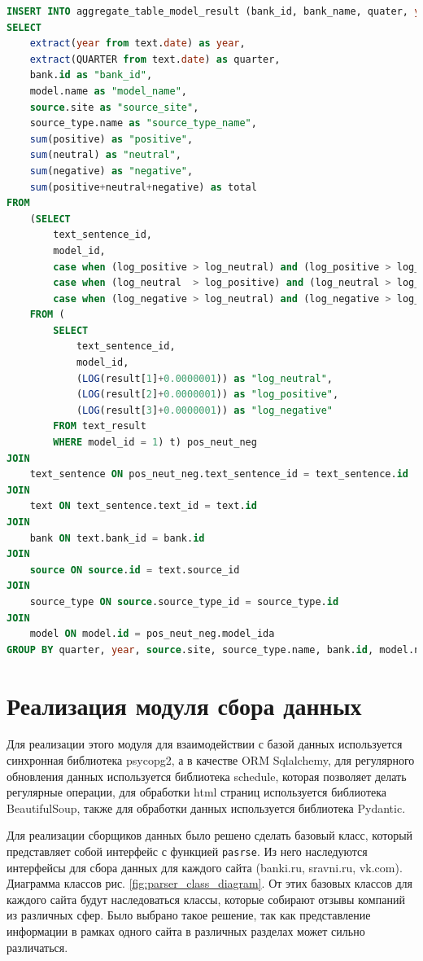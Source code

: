 \documentclass[PI, VKR]{HSEUniversity}
\begin{document}
\begin{lstlisting}[language=SQL,label=lst:sql_aggregate,caption={SQL запрос на агрегацию обработанных предложений},captionpos=b,numbers=none]
INSERT INTO aggregate_table_model_result (bank_id, bank_name, quater, year, model_name, source_site, source_type, positive, neutral, negative, total)
SELECT
    extract(year from text.date) as year,
    extract(QUARTER from text.date) as quarter,
    bank.id as "bank_id",
    model.name as "model_name",
    source.site as "source_site",
    source_type.name as "source_type_name",
    sum(positive) as "positive",
    sum(neutral) as "neutral",
    sum(negative) as "negative",
    sum(positive+neutral+negative) as total
FROM
    (SELECT
        text_sentence_id,
        model_id,
        case when (log_positive > log_neutral) and (log_positive > log_negative) then 1 else 0 end as "positive",
        case when (log_neutral  > log_positive) and (log_neutral > log_negative) then 1 else 0 end as "neutral",
        case when (log_negative > log_neutral) and (log_negative > log_positive) then 1 else 0 end as "negative"
    FROM (
        SELECT
            text_sentence_id,
            model_id,
            (LOG(result[1]+0.0000001)) as "log_neutral",
            (LOG(result[2]+0.0000001)) as "log_positive",
            (LOG(result[3]+0.0000001)) as "log_negative"
        FROM text_result
        WHERE model_id = 1) t) pos_neut_neg
JOIN
    text_sentence ON pos_neut_neg.text_sentence_id = text_sentence.id
JOIN
    text ON text_sentence.text_id = text.id
JOIN
    bank ON text.bank_id = bank.id
JOIN
    source ON source.id = text.source_id
JOIN
    source_type ON source.source_type_id = source_type.id
JOIN
    model ON model.id = pos_neut_neg.model_ida
GROUP BY quarter, year, source.site, source_type.name, bank.id, model.name
\end{lstlisting}
\section{Реализация модуля сбора данных}
\label{sec:orgd94727f}
Для реализации этого модуля для взаимодействии с базой данных используется синхронная библиотека psycopg2, а в качестве ORM Sqlalchemy, для регулярного обновления данных используется библиотека schedule, которая позволяет делать регулярные операции, для обработки html страниц используется библиотека BeautifulSoup, также для обработки данных используется библиотека Pydantic.

Для реализации сборщиков данных было решено сделать базовый класс, который представляет собой интерфейс с функцией \texttt{pasrse}. Из него наследуются интерфейсы для сбора данных для каждого сайта (banki.ru, sravni.ru, vk.com). Диаграмма классов рис. \ref{fig:parser_class_diagram}. От этих базовых классов для каждого сайта будут наследоваться классы, которые собирают отзывы компаний из различных сфер. Было выбрано такое решение, так как представление информации в рамках одного сайта в различных разделах может сильно различаться.
\end{document}
